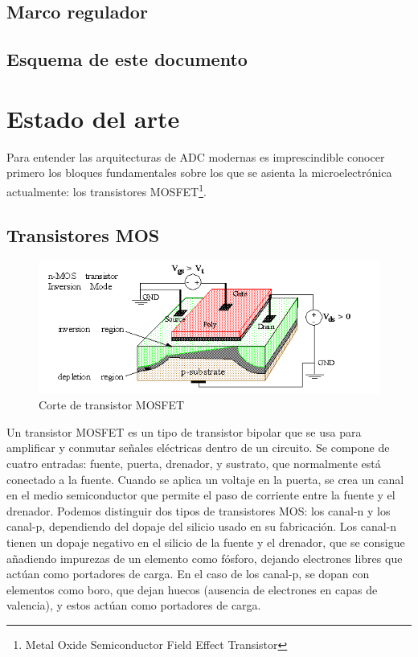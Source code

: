 \documentclass[12pt]{report} %
\begin{document}
	\section{Marco regulador}
	
	
	\section{Esquema de este documento}
	

	
	

\chapter{Estado del arte}

	Para entender las arquitecturas de ADC modernas es imprescindible conocer primero los bloques fundamentales sobre los que se asienta la microelectrónica actualmente: los transistores MOSFET\footnote{Metal Oxide Semiconductor Field Effect Transistor}.
	
	\section{Transistores MOS}
	
	\begin{figure}[H]
		\includegraphics[width=\textwidth]{mos_transistor.png}
		\caption[Corte de transistor MOSFET]{Corte de transistor MOSFET\protect\footnotemark}
		\label{fig:mos_transistor.png}
	\end{figure}

	
	Un transistor MOSFET es un tipo de transistor bipolar que se usa para amplificar y conmutar señales eléctricas dentro de un circuito. Se compone de cuatro entradas: fuente, puerta, drenador, y sustrato, que normalmente está conectado a la fuente. Cuando se aplica un voltaje en la puerta, se crea un canal en el medio semiconductor que permite el paso de corriente entre la fuente y el drenador. Podemos distinguir dos tipos de transistores MOS: los canal-n y los canal-p, dependiendo del dopaje del silicio usado en su fabricación. Los canal-n tienen un dopaje negativo en el silicio de la fuente y el drenador, que se consigue añadiendo impurezas de un elemento como fósforo, dejando electrones libres que actúan como portadores de carga. En el caso de los canal-p, se dopan con elementos como boro, que dejan huecos (ausencia de electrones en capas de valencia), y estos actúan como portadores de carga.
	
\end{document}

